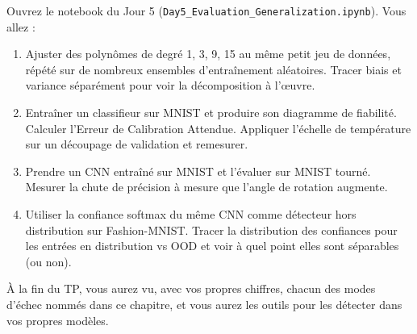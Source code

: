 Ouvrez le notebook du Jour 5 (\texttt{Day5\_Evaluation\_Generalization.ipynb}). Vous allez :

\begin{enumerate}
  \item Ajuster des polynômes de degré 1, 3, 9, 15 au même petit jeu de données, répété sur de nombreux ensembles d'entraînement aléatoires. Tracer biais et variance séparément pour voir la décomposition à l'œuvre.
  \item Entraîner un classifieur sur MNIST et produire son diagramme de fiabilité. Calculer l'Erreur de Calibration Attendue. Appliquer l'échelle de température sur un découpage de validation et remesurer.
  \item Prendre un CNN entraîné sur MNIST et l'évaluer sur MNIST tourné. Mesurer la chute de précision à mesure que l'angle de rotation augmente.
  \item Utiliser la confiance softmax du même CNN comme détecteur hors distribution sur Fashion-MNIST. Tracer la distribution des confiances pour les entrées en distribution vs OOD et voir à quel point elles sont séparables (ou non).
\end{enumerate}

À la fin du TP, vous aurez vu, avec vos propres chiffres, chacun des modes d'échec nommés dans ce chapitre, et vous aurez les outils pour les détecter dans vos propres modèles.
